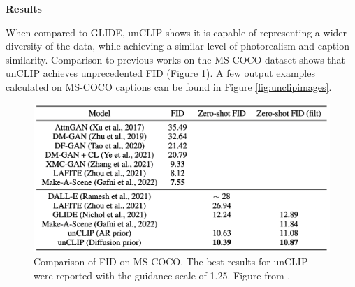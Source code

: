 \documentclass[
]{krantz}
\begin{document}
\textbf{Results}

When compared to GLIDE, unCLIP shows it is capable of representing a wider diversity of the data, while achieving a similar level of photorealism and caption similarity. Comparison to previous works on the MS-COCO dataset shows that unCLIP achieves unprecedented FID (Figure \ref{fig:uncliptable}). A few output examples calculated on MS-COCO captions can be found in Figure \ref{fig:unclipimages}.

\begin{figure}

{\centering \includegraphics[width=0.8\linewidth]{figures/02-02-text-2-img/uncliptable} 

}

\caption{Comparison of FID on MS-COCO. The best results for unCLIP were reported with the guidance scale of 1.25. Figure from \citet{DALLE2}.}\label{fig:uncliptable}
\end{figure}
\end{document}
